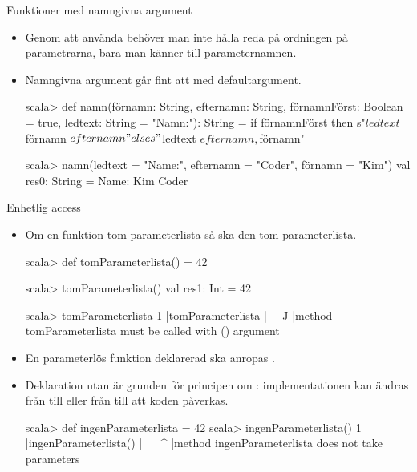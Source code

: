 \begin{Slide}{Funktioner med namngivna argument}
\begin{itemize}
\item Genom att använda  behöver man inte hålla reda på ordningen på parametrarna, bara man känner till parameternamnen.
\item Namngivna argument går fint att  med defaultargument.
\begin{REPLnonum}[basicstyle=\SlideFontSize{7}{9}\ttfamily\color{white}]
scala> def namn(förnamn: String,
                efternamn: String,
                förnamnFörst: Boolean = true,
                ledtext: String = "Namn:"): String =
         if förnamnFörst then s"$ledtext $förnamn $efternamn"
         else s"$ledtext $efternamn, $förnamn"

scala> namn(ledtext = "Name:", efternamn = "Coder", förnamn = "Kim")
val res0: String = Name: Kim Coder
\end{REPLnonum}
\end{itemize}
\end{Slide}


\begin{Slide}{Enhetlig access}\SlideFontSmall
\begin{itemize}
\item Om en funktion   tom parameterlista \code{()} så ska den   tom parameterlista.
\begin{REPLsmall}
scala> def tomParameterlista() = 42

scala> tomParameterlista()
val res1: Int = 42

scala> tomParameterlista                                                                                                                    
1 |tomParameterlista
  |^^^^^^^^^^^^^^^^^
  |method tomParameterlista must be called with () argument
\end{REPLsmall}

\item En parameterlös funktion deklarerad  \code{()} ska anropas  \code{()}. 
\item Deklaration utan \code{()} är grunden för principen om \Emph{enhetlig access}: implementationen kan ändras från  till  eller från  till   att  koden påverkas.
\pause

\begin{REPLsmall}
scala> def ingenParameterlista = 42
scala> ingenParameterlista()
1 |ingenParameterlista()
  |^^^^^^^^^^^^^^^^^^^
  |method ingenParameterlista does not take parameters
\end{REPLsmall}
\end{itemize}
\end{Slide}

